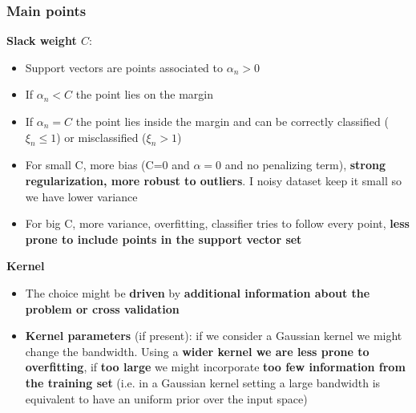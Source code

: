 \subsubsection{Main points}
    \textbf{Slack weight $C$}:
    \begin{itemize}
        \item Support vectors are points associated to $\alpha_n > 0$
        \item If $\alpha_n < C$ the point lies on the margin
        \item If $\alpha_n = C$ the point lies inside the margin and can be correctly classified ($\xi_n \leq 1$) or misclassified ($\xi_n > 1$)
        \item For small C, more bias (C=0 and $\alpha=0$ and no penalizing term), \textbf{strong regularization, more robust to outliers}. I noisy dataset keep it small so we have lower variance
        \item For big C, more variance, overfitting, classifier tries to follow every point, \textbf{less prone to include points in the support vector set}
    \end{itemize}
    \textbf{Kernel}
    \begin{itemize}
        \item The choice might be \textbf{driven} by \textbf{additional information about the problem or cross validation}
        \item \textbf{Kernel parameters} (if present): if we consider a Gaussian kernel we might change the bandwidth. Using a \textbf{wider kernel we are less prone to overfitting}, if \textbf{too large} we might incorporate \textbf{too few information from the training set} (i.e. in a Gaussian kernel setting a large bandwidth is equivalent to have an uniform prior over the input space)
    \end{itemize}



